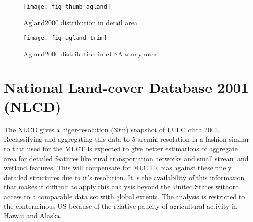 
\begin{figure}[hpt]
\begin{center}
  

\texttt{[image: fig\_thumb\_agland]}
\end{center} 
\caption{Agland2000 distribution in detail area}
\label{fig:thumb_agland} 
\end{figure} 

\begin{figure}[hpt]
\begin{center}
  

\texttt{[image: fig\_agland\_trim]}
\end{center} 
\caption{Agland2000 distribution in cUSA study area}
\label{fig:agland} 
\end{figure} 


\begin{comment}
\section{Major Land Uses (MLU)}
\label{sec:mlu}

This is a tabular data set published by the Economic Research Service
(ERS) at the USDA of land acreages by various uses and covers at a
state level.  We hope to compare our results to this data on a
state-by-state basis in order as a check and possibly incorporate some
of its information as a refinement.

\end{comment}

\section{National Land-cover Database 2001 (NLCD)}
\label{sec:nlcd}

\citet{Homer2004}


The NLCD gives a higer-resolution (30m) snapshot of LULC circa 2001.
 Reclassifying and aggregating this data to 5-arcmin
resolution in a fashion similar to that used for the MLCT is expected
to give better estimations of aggregate area for detailed features
like rural transportation networks and small stream and wetland
features.  This will compensate for MLCT's bias against these finely
detailed structures due to it's resolution.  It is the availability of
this information that makes it difficult to apply this analysis beyond
the United States without access to a comparable data set with global
extents.  The analysis is restricted to the conterminous US because of
the relative paucity of agricultural activity in Hawaii and Alaska.

